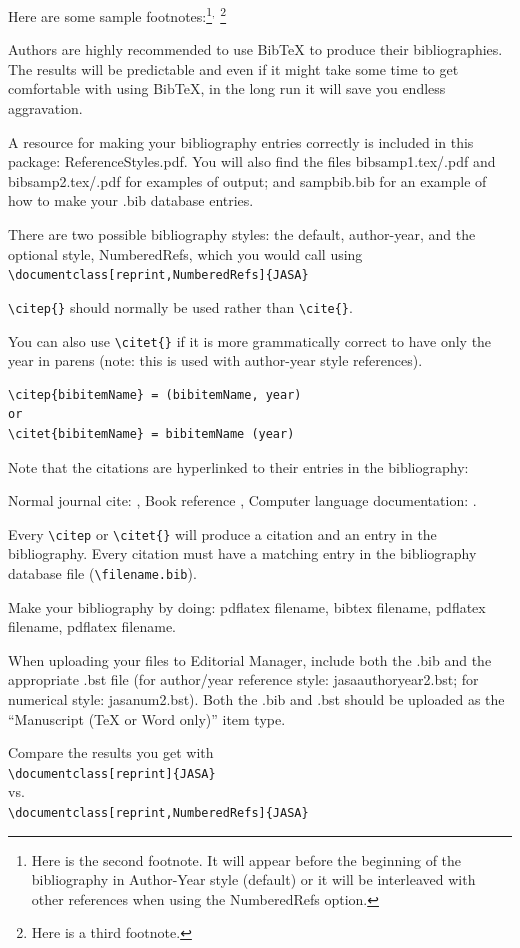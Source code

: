 \documentclass[reprint]{JASA}
\begin{document}
Here are some sample footnotes:\footnote{Here is the second footnote.
It will appear before the beginning of the bibliography in Author-Year
style (default) or it will be 
 interleaved with other references when using the Numbered\-Refs
 option.}$^,$%
\footnote{Here is a third footnote.}


Authors are highly  recommended to use BibTeX to produce their
bibliographies. The results will be predictable and even if
it might take some time to get comfortable with  using BibTeX,
in the long run it will save you endless aggravation.

A resource for making your bibliography entries
correctly is included in this package: 
ReferenceStyles.pdf. You will also find
the files
bibsamp1.tex/.pdf and bibsamp2.tex/.pdf
for examples of output; and sampbib.bib for an example of
how to make your .bib database entries.

There are two possible bibliography styles: the default, author-year,
and the optional style, Numbered\-Refs, which you would call using\\
{\verb+\documentclass[reprint,NumberedRefs]{JASA}+ }

\verb+\citep{}+ should normally be used rather than \verb+\cite{}+.



You can also use \verb+\citet{}+ if it is more grammatically correct
to have only the year in parens (note: this is used with author-year style references).

\begin{verbatim}
\citep{bibitemName} = (bibitemName, year)
or
\citet{bibitemName} = bibitemName (year)
\end{verbatim}

Note that the citations are hyperlinked to their entries in the
bibliography:

Normal journal cite: \citep{joursamp1},
 Book reference \citet{booksamp1}, 
Computer language documentation:
\citep{sampcode2}.

Every \verb+\citep+  or \verb+\citet{}+ will produce a citation and an entry in the
bibliography. Every citation must have a matching entry in the
bibliography
database file (\verb+\filename.bib+).

Make your bibliography by doing: pdflatex filename,  bibtex filename,
pdflatex filename, pdflatex filename.


When uploading your files to Editorial Manager,  include both the
.bib and the appropriate .bst file (for\break 
\newpage
\noindent
author/year reference style: jasaauthoryear2.bst; for numerical style: jasanum2.bst). Both the .bib and .bst should be uploaded as the “Manuscript (TeX or Word only)” item type.


Compare the results you get with\\
\verb+\documentclass[reprint]{JASA}+ \\
vs.\\
\verb+\documentclass[reprint,NumberedRefs]{JASA}+ 



\end{document}
